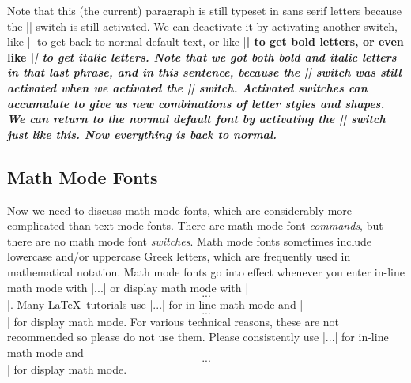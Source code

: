 \documentclass{article}
\begin{document}
Note that this (the current) paragraph is still typeset in sans serif letters because 
the |\sffamily| switch is still activated. We can deactivate it by activating 
another switch, like |\normalfont| \normalfont to get back to normal default 
text, or like |\bfseries| \bfseries to get bold letters, or even like 
|\itshape| \itshape to get italic letters. Note that we got both bold and italic 
letters in that last phrase, and in this sentence, because the |\bfseries| switch 
was still activated when we activated the |\itshape| switch. Activated switches 
can accumulate to give us new combinations of letter styles and shapes. We can return 
to the normal default font by activating the |\normalfont| switch \normalfont 
just like this. Now everything is back to normal.

\subsection{Math Mode Fonts}
Now we need to discuss math mode fonts, which are considerably more complicated than 
text mode fonts. There are math mode font \emph{commands}, but there are no math mode 
font \emph{switches}. Math mode fonts sometimes include lowercase and/or uppercase 
Greek letters, which are frequently used in mathematical notation. Math mode fonts 
go into effect whenever you enter in-line math mode with |\(...\)| or display 
math mode with |\[...\]|. Many \LaTeX\ tutorials use |$...$| for in-line 
math mode and |$$...$$| for display math mode. For various technical reasons, 
these are not recommended so please do not use them. Please consistently use 
|\(...\)| for in-line math mode and |\[...\]| for display math mode.
\end{document}
